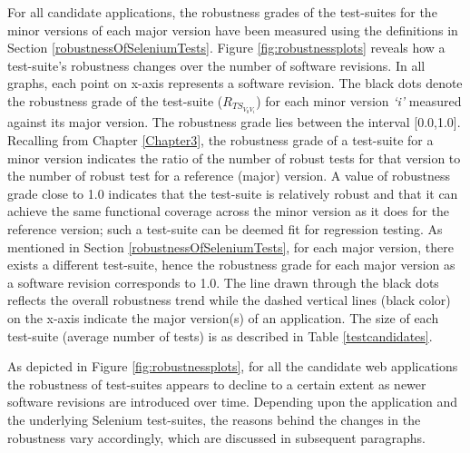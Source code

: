   
For all candidate applications, the robustness grades of the test-suites for the minor versions of each major version have been measured using the definitions in Section \ref{robustnessOfSeleniumTests}. Figure \ref{fig:robustnessplots} reveals how a test-suite's robustness changes over the number of software revisions. In all graphs, each point on x-axis represents a software revision. The black dots denote the robustness grade of the test-suite ($R_{TS_{V_{0}V_{i}}}$) for each minor version \textit{`i'} measured against its major version. The robustness grade lies between the interval [0.0,1.0]. Recalling from Chapter \ref{Chapter3}, the robustness grade of a test-suite for a minor version indicates the ratio of the number of robust tests for that version to the number of robust test for a reference (major) version. A value of robustness grade close to 1.0 indicates that the test-suite is relatively robust and that it can achieve the same functional coverage across the minor version as it does for the reference version; such a test-suite can be deemed fit for regression testing. As mentioned in Section \ref{robustnessOfSeleniumTests}, for each major version, there exists a different test-suite, hence the robustness grade for each major version as a software revision corresponds to 1.0. The line drawn through the black dots reflects the overall robustness trend while the dashed vertical lines (black color) on the x-axis indicate the major version(s) of an application. The size of each test-suite (average number of tests) is as described in Table \ref{testcandidates}.

As depicted in Figure \ref{fig:robustnessplots}, for all the candidate web applications the robustness of test-suites appears to decline to a certain extent as newer software revisions are introduced over time. Depending upon the application and the underlying Selenium test-suites, the reasons behind the changes in the robustness vary accordingly, which are discussed in subsequent paragraphs. 

